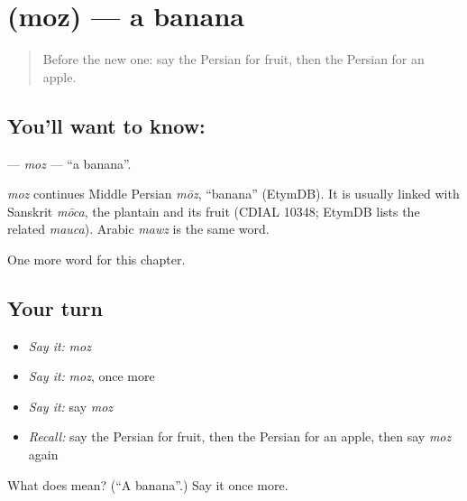 \section[\texorpdfstring{\fa{موز} (moz)}{موز (moz)}]{ (moz) — a banana}

\label{lesson:FA-C41-moz}



\begin{quote}
Before the new one: say the Persian for fruit, then the Persian for an apple.
\end{quote}

\subsection*{You'll want to know: }
\textbf{} — \emph{moz} — \textquotedblleft{}a banana\textquotedblright{}.

\begin{cousinweb}
\emph{moz} continues Middle Persian \emph{mōz}, \textquotedblleft{}banana\textquotedblright{} (EtymDB). It is usually linked with Sanskrit \emph{mōca}, the plantain and its fruit (CDIAL 10348; EtymDB lists the related \emph{mauca}). Arabic \emph{mawz} is the same word.
\end{cousinweb}

\begin{grammarlens}[title={What you've built}]
One more word for this chapter.
\end{grammarlens}

\subsection*{Your turn}
\begin{itemize}
\raggedright
  \item \emph{Say it:} \emph{moz}
  \item \emph{Say it:} \emph{moz}, once more
  \item \emph{Say it:} say \emph{moz}
  \item \emph{Recall:} say the Persian for fruit, then the Persian for an apple, then say \emph{moz} again
\end{itemize}

\begin{tcolorbox}[breakable,colback=teal!4,colframe=teal!35!black,title={Before you move on}]
What does  mean? (\textquotedblleft{}A banana\textquotedblright{}.) Say it once more.
\end{tcolorbox}
